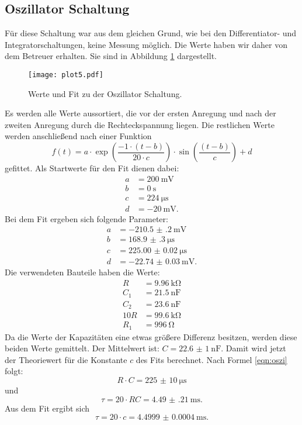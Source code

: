 \documentclass[
  bibliography=totoc,     %
  captions=tableheading,  %
  titlepage=firstiscover, %
]{scrartcl}
\begin{document}
\subsection{Oszillator Schaltung}
Für diese Schaltung war aus dem gleichen Grund, wie bei den Differentiator- und
Integratorschaltungen, keine Messung möglich. Die Werte haben wir daher
von dem Betreuer erhalten. Sie sind in Abbildung \ref{fig:plot5} dargestellt.
\begin{figure}[H]
  \centering
  \texttt{[image: plot5.pdf]}
  \caption{Werte und Fit zu der Oszillator Schaltung.}
  \label{fig:plot5}
\end{figure}
\noindent
Es werden alle Werte aussortiert, die vor der ersten Anregung und nach der zweiten
Anregung durch die Rechteckspannung liegen. Die restlichen Werte werden anschließend
nach einer Funktion
\begin{equation*}
  f(t) = a \cdot \exp{\left(\frac{-1 \cdot (t-b)}{20 \cdot c}\right)} \cdot \sin{\left(\frac{(t-b)}{c}\right)} + d
\end{equation*}
gefittet.
Als Startwerte für den Fit dienen dabei:
\begin{align*}
  a &= \SI{200}{\milli\volt} \\
  b &= \SI{0}{\second} \\
  c &= \SI{224}{\micro\second} \\
  d &= \SI{-20}{\milli\volt}.
\end{align*}
Bei dem Fit ergeben sich folgende Parameter:
\begin{align*}
  a &= \SI{-210.5(2)}{\milli\volt} \\
  b &= \SI{168.9(3)}{\micro\second} \\
  c &= \SI{225.00(2)}{\micro\second} \\
  d &= \SI{-22.74(3)}{\milli\volt}.
\end{align*}
Die verwendeten Bauteile haben die Werte:
\begin{align*}
  R &= \SI{9.96}{\kilo\ohm} \\
  C_1 &= \SI{21.5}{\nano\farad} \\
  C_2 &= \SI{23.6}{\nano\farad} \\
  10R &= \SI{99.6}{\kilo\ohm} \\
  R_1 &= \SI{996}{\ohm}
\end{align*}
Da die Werte der Kapazitäten eine etwas größere Differenz besitzen, werden diese
beiden Werte gemittelt. Der Mittelwert ist: $C = \SI{22.6(10)}{\nano\farad}$.
Damit wird jetzt der Theoriewert für die Konstante $c$ des Fits berechnet.
Nach Formel \eqref{eqn:oszi} folgt:
\begin{equation*}
  R \cdot C = \SI{225(10)}{\micro\second}
\end{equation*}
und
\begin{equation*}
  \tau = 20\cdot R C = \SI{4.49(21)}{\milli\second}.
\end{equation*}
Aus dem Fit ergibt sich
\begin{equation*}
  \tau = 20 \cdot c = \SI{4.4999(4)}{\milli\second}.
\end{equation*}
\clearpage
\end{document}
